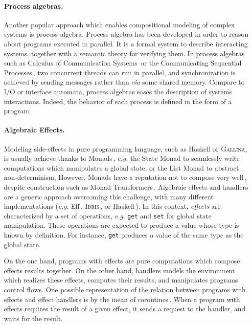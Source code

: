 \paragraph{Process algebras.}
%
Another popular approach which enables compositional modeling of complex systems
is process algebra.
%
Process algebra has been developed in order to reason about programs executed in
parallel.
%
It is a formal system to describe interacting systems, together with a semantic
theory for verifying them.
%
In process algebras such as Calculus of Communication
Systems\,\cite{milner1980ccs} or the Communicating Sequential
Processes\,\cite{hoare1978csp}, two concurrent threads can run in parallel, and
synchronization is achieved by sending messages rather than \emph{via} some
shared memory.
%
Compare to I/O or interface automata, process algebras eases the description of
systems interactions.
%
Indeed, the behavior of each process is defined in the form of a program.

\paragraph{Algebraic Effects.}
%
Modeling side-effects in pure programming language, such as Haskell or {\scshape
  Gallina}, is usually achieve thanks to
Monads\,\cite{wadler1990comprehending,jones2005io}, \emph{e.g.} the State Monad
to seamlessly write computations which manipulates a global state, or the List
Monad to abstract non-determinism,
%
However, Monads have a reputation not to compose very
well\,\cite{hyland2006combining}, despite construction such as Monad
Transformers\,\cite{liang1995mtl}.
%
Algebraic effects and handlers are a generic approach overcoming this challenge,
with many different implementations (\emph{e.g.} Eff\,\cite{bauer2015effects},
{\scshape Idris}\,\cite{brady2013idris}, or
Haskell\,\cite{kiselyov2013extensible}).
%
In this context, \emph{effects} are characterized by a set of operations,
\emph{e.g.} \texttt{get} and \texttt{set} for global state manipulation.
%
These operations are expected to produce a value whose type is known by
definition.
%
For instance, \texttt{get} produces a value of the same type as the global
state.

On the one hand, programs with effects are pure computations which compose
effects results together.
%
On the other hand, handlers models the environment which realizes these effects,
computes their results, and manipulates programs control flows.
%
One possible representation of the relation between programs with effects and
effect handlers is by the mean of coroutines\,\cite{kiselyov2013extensible}.
%
When a program with effects requires the result of a given effect, it sends a
request to the handler, and waits for the result.


